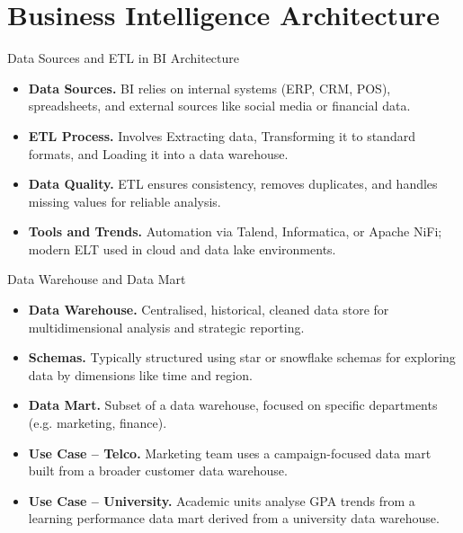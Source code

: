 \documentclass[aspectratio=169, table]{beamer}
\begin{document}
\section{Business Intelligence Architecture}

\begin{frame}{Data Sources and ETL in BI Architecture}
	\vspace{20pt}
	\begin{itemize}
		\item \textbf{Data Sources.} BI relies on internal systems (ERP, CRM, POS), spreadsheets, and external sources like social media or financial data.
		\item \textbf{ETL Process.} Involves Extracting data, Transforming it to standard formats, and Loading it into a data warehouse.
		\item \textbf{Data Quality.} ETL ensures consistency, removes duplicates, and handles missing values for reliable analysis.
		\item \textbf{Tools and Trends.} Automation via Talend, Informatica, or Apache NiFi; modern ELT used in cloud and data lake environments.
	\end{itemize}
\end{frame}



\begin{frame}{Data Warehouse and Data Mart}
	\vspace{20pt}
	\begin{itemize}
		\item \textbf{Data Warehouse.} Centralised, historical, cleaned data store for multidimensional analysis and strategic reporting.
		\item \textbf{Schemas.} Typically structured using star or snowflake schemas for exploring data by dimensions like time and region.
		\item \textbf{Data Mart.} Subset of a data warehouse, focused on specific departments (e.g. marketing, finance).
		\item \textbf{Use Case – Telco.} Marketing team uses a campaign-focused data mart built from a broader customer data warehouse.
		\item \textbf{Use Case – University.} Academic units analyse GPA trends from a learning performance data mart derived from a university data warehouse.
	\end{itemize}
\end{frame}
\end{document}
